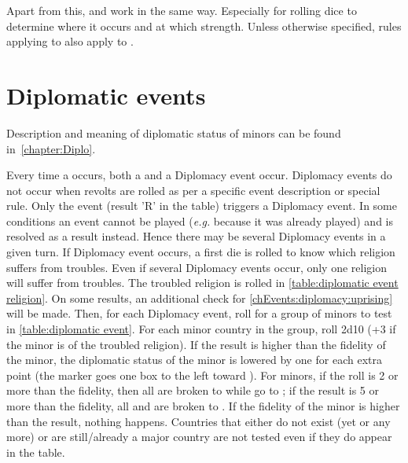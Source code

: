 \aparag Apart from this, \REVOLT and \REBELLION work in the same
way. Especially for rolling dice to determine where it occurs and at
which strength.
\bparag Unless otherwise specified, rules applying to \REVOLT also apply
to \REBELLION.



\section{Diplomatic events}\label{chEvents:diplomacy}

\begin{designnote}
  Description and meaning of diplomatic status of minors can be found
  in~\ref{chapter:Diplo}.
\end{designnote}

\aparag Every time a \RD occurs, both a \REVOLT and a Diplomacy event
occur.
\bparag Diplomacy events do not occur when revolts are rolled as per a
specific event description or special rule. Only the \RD event (result
'R' in the table) triggers a Diplomacy event.
\bparag In some conditions an event cannot be played (\emph{e.g.}
because it was already played) and is resolved as a \RD result
instead. Hence there may be several Diplomacy events in a given turn.
\aparag If Diplomacy event occurs, a first die is rolled to know which
religion suffers from troubles.
\bparag Even if several Diplomacy events occur, only one religion will
suffer from troubles.
\bparag The troubled religion is rolled in \ref{table:diplomatic event
  religion}.
\bparag On some results, an additional check for
\ref{chEvents:diplomacy:uprising} will be made.
\aparag Then, for each Diplomacy event, roll for a group of minors to
test in \ref{table:diplomatic event}.
\bparag For each minor country in the group, roll 2d10 (+3 if the
minor is of the troubled religion).
\bparag If the result is higher than the fidelity of the minor, the
diplomatic status of the minor is lowered by one for each extra point
(the marker goes one box to the left toward \Neutral).
\bparag For \ROTW minors, if the roll is 2 or more than the fidelity,
then all \dipFR are broken to \dipNR while \dipAT go to \dipFR ; if the
result is 5 or more than the fidelity, all \dipAT and \dipFR are broken
to \dipNR.
\bparag If the fidelity of the minor is higher than the result, nothing
happens.
\bparag Countries that either do not exist (yet or any more) or are
still/already a major country are not tested even if they do appear in
the table.

